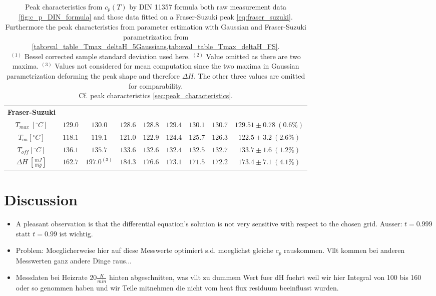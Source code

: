 \documentclass{scrartcl}[12pt, halfparskip]
\numberwithin{equation}{section}
\numberwithin{figure}{section}
\numberwithin{table}{section}
\begin{document}
\begin{table}[H]
\begin{tabular}{| c | c | c | c | c | c | c | c || c |}
		
		\textbf{Fraser-Suzuki} & & & & & & & & \\[0.7ex]
		$T_{max} \ [^{\circ}C]$ & $129.0$ & $130.0$ & $128.6$ & $128.8$ & $129.4$ & $130.1$ & $130.7$ & $129.51 \pm 0.78 \ (0.6\%)$ \\[0.7ex]
		$T_{on} [^{\circ} C]$ & $118.1$ & $119.1$ & $121.0$ & $122.9$ & $124.4$ & $125.7$ & $126.3$ & $122.5 \pm 3.2 \ (2.6\%)$ \\[0.7ex]
		$T_{off} [^{\circ} C]$ & $136.1$ & $135.7$ & $133.6$ & $132.6$ & $132.4$ & $132.5$ & $132.7$ & $133.7 \pm 1.6 \ (1.2\%)$ \\[0.7ex]
		$\Delta H \ [\frac{mJ}{mg}]$ & $162.7$ & $197.0^{(3)}$ & $184.3$ & $176.6$ & $173.1$ & $171.5$ & $172.2$ & $173.4 \pm 7.1 \ (4.1\%)$ \\ \hline
	\end{tabular}
	\caption{Peak characteristics from $c_p(T)$ by DIN 11357 formula both raw measurement data \cref{fig:c_p_DIN_formula} and those data fitted on a Fraser-Suzuki peak \cref{eq:fraser_suzuki}. Furthermore the peak characteristics from parameter estimation with Gaussian and Fraser-Suzuki parametrization from \cref{tab:eval_table_Tmax_deltaH_5Gaussians,tab:eval_table_Tmax_deltaH_FS}. \\
	$^{(1)}$ Bessel corrected sample standard deviation used here. $^{(2)}$ Value omitted as there are two maxima. $^{(3)}$ Values not considered for mean computation since the two maxima in Gaussian parametrization deforming the peak shape and therefore $\Delta H$. The other three values are omitted for comparability. \\
	Cf. peak characteristics \cref{sec:peak_characteristics}.}
	\label{tab:eval_table_summary}
\end{table}




\newpage
\section{Discussion}
\label{sec:discussion}

\begin{itemize}
	\item A pleasant observation is that the differential equation's solution is not very sensitive with respect to the chosen grid.  Ausser: $t=0.999$ statt $t=0.99$ ist wichtig.
	\item Problem: Moeglicherweise hier auf diese Messwerte optimiert s.d. moeglichst gleiche $c_p$ rauskommen. Vllt kommen bei anderen Messwerten ganz andere Dinge raus...
	\item Messdaten bei Heizrate $20 \frac{K}{min}$ hinten abgeschnitten, was vllt zu dummem Wert fuer dH fuehrt weil wir hier Integral von 100 bis 160 oder so genommen haben und wir Teile mitnehmen die nicht vom heat flux residuum beeinflusst wurden.
\end{itemize}
\end{document}
